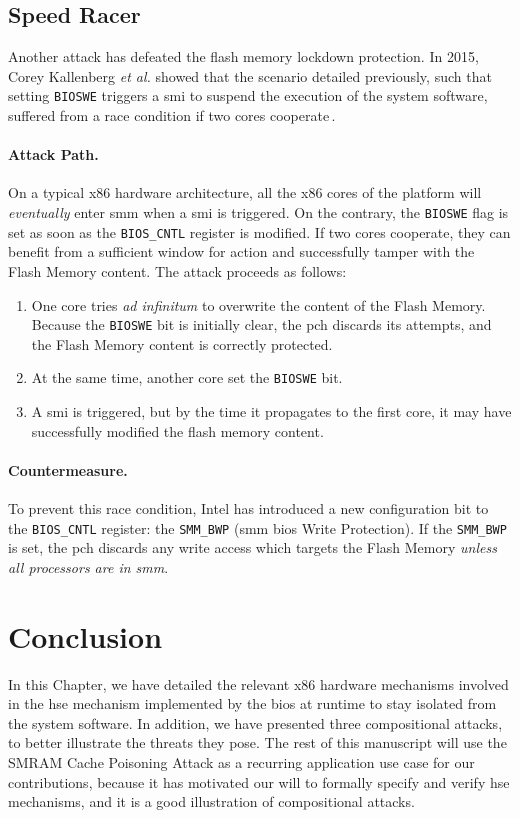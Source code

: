 \subsection{Speed Racer}
\label{subsec:usecase:hse:speed}

Another attack has defeated the flash memory lockdown protection.
%
In 2015, Corey Kallenberg \emph{et al.} showed that the scenario detailed
previously, such that setting \texttt{BIOSWE} triggers a \ac{smi} to suspend the
execution of the system software, suffered from a race condition if two cores
cooperate\,\cite{kallenberg2015racecondition}.

\paragraph{Attack Path.}
%
On a typical x86 hardware architecture, all the x86 cores of the platform will
\emph{eventually} enter \ac{smm} when a \ac{smi} is triggered.
%
On the contrary, the \texttt{BIOSWE} flag is set as soon as the
\texttt{BIOS\_CNTL} register is modified.
%
If two cores cooperate, they can benefit from a sufficient window for action and
successfully tamper with the Flash Memory content.
%
The attack proceeds as follows:

\begin{enumerate}
\item One core tries \emph{ad infinitum} to overwrite the content of the Flash
  Memory.
  Because the \texttt{BIOSWE} bit is initially clear, the \ac{pch} discards its
  attempts, and the Flash Memory content is correctly protected.
%
\item At the same time, another core set the \texttt{BIOSWE} bit.
%
\item A \ac{smi} is triggered, but by the time it propagates to the first core,
  it may have successfully modified the flash memory content.
%
\end{enumerate}

\paragraph{Countermeasure.}
%
To prevent this race condition, Intel has introduced a new configuration bit to
the \texttt{BIOS\_CNTL} register: the \texttt{SMM\_BWP} (\ac{smm} \ac{bios}
Write Protection).
%
If the \texttt{SMM\_BWP} is set, the \ac{pch} discards any write access which
targets the Flash Memory \emph{unless all processors are in \ac{smm}}.

\section{Conclusion}
\label{sec:usecase:conclusion}

In this Chapter, we have detailed the relevant x86 hardware mechanisms involved
in the \ac{hse} mechanism implemented by the \ac{bios} at runtime to stay
isolated from the system software.
%
In addition, we have presented three compositional attacks, to better illustrate
the threats they pose.
%
The rest of this manuscript will use the SMRAM Cache Poisoning Attack as a
recurring application use case for our contributions, because it has motivated
our will to formally specify and verify \ac{hse} mechanisms, and it is a good
illustration of compositional attacks.
